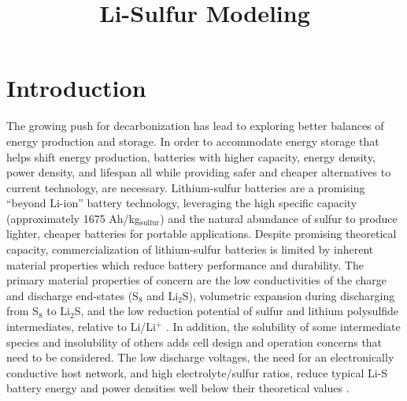 \documentclass{elsarticle}
\title{Li-Sulfur Modeling}
\begin{document}
\maketitle

\section{Introduction}
The growing push for decarbonization has lead to exploring better balances of energy production and storage. In order to accommodate energy storage that helps shift energy production, batteries with higher capacity, energy density, power density, and lifespan all while providing safer and cheaper alternatives to current technology, are necessary. Lithium-sulfur batteries are a promising “beyond Li-ion” battery technology, leveraging the high specific capacity (approximately 1675 Ah/kg$_\mathrm{sulfur}$) and the natural abundance of sulfur to produce lighter, cheaper batteries for portable applications. Despite promising theoretical capacity, commercialization of lithium-sulfur batteries is limited by inherent material properties which reduce battery performance and durability. The primary material properties of concern are the low conductivities of the charge and discharge end-states (S$_8$ and Li$_2$S), volumetric expansion during discharging from S$_8$ to Li$_2$S, and the low reduction potential of sulfur and lithium polysulfide intermediates, relative to Li/Li$^+$ \cite{ZHANG2018831, FRONCZEK2013183, C5EE01388G}. In addition, the solubility of some intermediate species and insolubility of others adds cell design and operation concerns that need to be considered. The low discharge voltages, the need for an electronically conductive host network, and high electrolyte/sulfur ratios, reduce typical Li-S battery energy and power densities well below their theoretical values \cite{BRUCKNER201482, akridge2004}.
\end{document}
